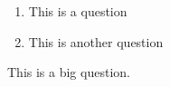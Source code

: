 \documentclass[a4paper,11pt]{article}
\begin{document}
\makeexamcover

\begin{enumerate}
    \item This is a question 
    \item This is another question 
\end{enumerate}

This is a big question. 
\end{document}
